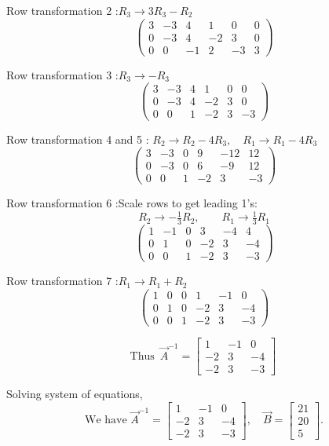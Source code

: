 \documentclass[journal]{IEEEtran}
\begin{document}
Row transformation 2 :\quad $R_3 \to 3R_3 - R_2$
\[
\left(
\begin{array}{ccc|ccc}
3 & -3 & 4 & 1 & 0 & 0 \\[4pt]
0 & -3 & 4 & -2 & 3 & 0 \\[4pt]
0 & 0 & -1 & 2 & -3 & 3
\end{array}
\right)
\]

Row transformation 3 :\quad $R_3 \to -R_3$
\[
\left(
\begin{array}{ccc|ccc}
3 & -3 & 4 & 1 & 0 & 0 \\[4pt]
0 & -3 & 4 & -2 & 3 & 0 \\[4pt]
0 & 0 & 1 & -2 & 3 & -3
\end{array}
\right)
\]

Row transformation 4 and 5 :\quad
$R_2 \to R_2 - 4R_3,\quad R_1 \to R_1 - 4R_3$
\[
\left(
\begin{array}{ccc|ccc}
3 & -3 & 0 & 9 & -12 & 12 \\[4pt]
0 & -3 & 0 & 6 & -9 & 12 \\[4pt]
0 & 0 & 1 & -2 & 3 & -3
\end{array}
\right)
\]

Row transformation 6 :\quad Scale rows to get leading 1's:
\[
R_2 \to -\tfrac{1}{3}R_2,\qquad R_1 \to \tfrac{1}{3}R_1
\]
\[
\left(
\begin{array}{ccc|ccc}
1 & -1 & 0 & 3 & -4 & 4 \\[4pt]
0 & 1 & 0 & -2 & 3 & -4 \\[4pt]
0 & 0 & 1 & -2 & 3 & -3
\end{array}
\right)
\]

Row transformation 7 :\quad $R_1 \to R_1 + R_2$
\[
\left(
\begin{array}{ccc|ccc}
1 & 0 & 0 & 1 & -1 & 0 \\[4pt]
0 & 1 & 0 & -2 & 3 & -4 \\[4pt]
0 & 0 & 1 & -2 & 3 & -3
\end{array}
\right)
\]

\[
\text{Thus }
\boxed{\,\vec{A}^{-1} =
\begin{bmatrix}
1 & -1 & 0\\[4pt]
-2 & 3 & -4\\[4pt]
-2 & 3 & -3
\end{bmatrix}\,}
\]

Solving system of equations,
\[
\text{We have } 
\vec{A}^{-1} =
\begin{bmatrix}
1 & -1 & 0 \\[4pt]
-2 & 3 & -4 \\[4pt]
-2 & 3 & -3
\end{bmatrix}, 
\quad
\vec{B} =
\begin{bmatrix}
21 \\[4pt]
20 \\[4pt]
5
\end{bmatrix}.
\]
\end{document}
